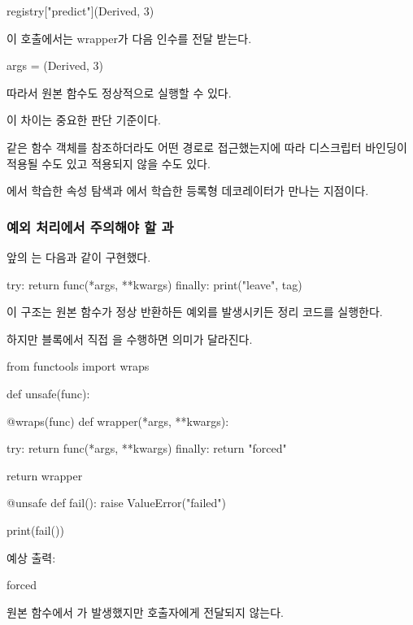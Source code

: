 \begin{dhkcode}
registry["predict"](Derived, 3)
\end{dhkcode}

이 호출에서는 wrapper가 다음 인수를 전달 받는다.

\begin{dhkzsh}
args = (Derived, 3)
\end{dhkzsh}

따라서 원본 함수도 정상적으로 실행할 수 있다.

이 차이는 중요한 판단 기준이다.

같은 함수 객체를 참조하더라도 어떤 경로로 접근했는지에 따라 디스크립터 바인딩이 적용될 수도 있고 적용되지 않을 수도 있다.

에서 학습한 속성 탐색과 에서 학습한 등록형 데코레이터가 만나는 지점이다.

\subsubsection{예외 처리에서 주의해야 할 과 }

앞의 는 다음과 같이 구현했다.

\begin{dhkcode}
try:
    return func(*args, **kwargs)
finally:
    print("leave", tag)
\end{dhkcode}

이 구조는 원본 함수가 정상 반환하든 예외를 발생시키든 정리 코드를 실행한다.

하지만  블록에서 직접 을 수행하면 의미가 달라진다.

\begin{dhkcode}
from functools import wraps


def unsafe(func):

    @wraps(func)
    def wrapper(*args, **kwargs):

        try:
            return func(*args, **kwargs)
        finally:
            return "forced"

    return wrapper


@unsafe
def fail():
    raise ValueError("failed")


print(fail())
\end{dhkcode}

예상 출력:

\begin{dhkzsh}
forced
\end{dhkzsh}

원본 함수에서 가 발생했지만 호출자에게 전달되지 않는다.

